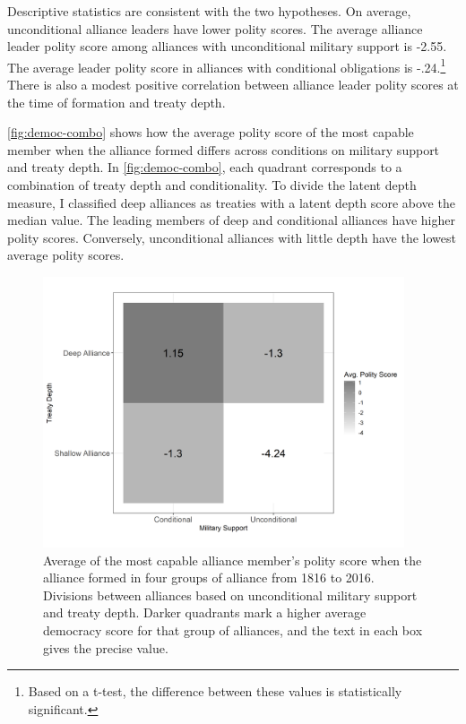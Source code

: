 \documentclass[12pt]{article}
\begin{document}
Descriptive statistics are consistent with the two hypotheses.
On average, unconditional alliance leaders have lower polity scores.
The average alliance leader polity score among alliances with unconditional military support is -2.55. 
The average leader polity score in alliances with conditional obligations is -.24.\footnote{Based on a t-test, the difference between these values is statistically significant.} 
There is also a modest positive correlation between alliance leader polity scores at the time of formation and treaty depth. 


\autoref{fig:democ-combo} shows how the average polity score of the most capable member when the alliance formed differs across conditions on military support and treaty depth.
In \autoref{fig:democ-combo}, each quadrant corresponds to a combination of treaty depth and conditionality. 
To divide the latent depth measure, I classified deep alliances as treaties with a latent depth score above the median value. 
The leading members of deep and conditional alliances have higher polity scores. 
Conversely, unconditional alliances with little depth have the lowest average polity scores. 


\begin{figure}[hbtp]
\centering
\includegraphics[width=0.95\textwidth]{../figures/democ-combo.png}
\caption{Average of the most capable alliance member's polity score when the alliance formed in four groups of alliance from 1816 to 2016. Divisions between alliances based on unconditional military support and treaty depth. Darker quadrants mark a higher average democracy score for that group of alliances, and the text in each box gives the precise value.}
\label{fig:democ-combo}
\end{figure}
\end{document}
